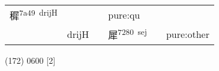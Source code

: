 \documentclass[14pt,a4paper]{scrartcl}
\begin{document}
\begin{longtable}[c]{@{}llllll@{}}
\begin{minipage}[t]{0.14\columnwidth}\raggedright\strut
穉\textsuperscript{7a49~drijH}
\strut\end{minipage} &
\begin{minipage}[t]{0.14\columnwidth}\raggedright\strut
\strut\end{minipage} &
\begin{minipage}[t]{0.14\columnwidth}\raggedright\strut
\strut\end{minipage} &
\begin{minipage}[t]{0.14\columnwidth}\raggedright\strut
pure:qu
\strut\end{minipage}\tabularnewline
\begin{minipage}[t]{0.14\columnwidth}\raggedright\strut
𡱕
\strut\end{minipage} &
\begin{minipage}[t]{0.14\columnwidth}\raggedright\strut
drijH
\strut\end{minipage} &
\begin{minipage}[t]{0.14\columnwidth}\raggedright\strut
\strut\end{minipage} &
\begin{minipage}[t]{0.14\columnwidth}\raggedright\strut
犀\textsuperscript{7280~sej}
\strut\end{minipage} &
\begin{minipage}[t]{0.14\columnwidth}\raggedright\strut
\strut\end{minipage} &
\begin{minipage}[t]{0.14\columnwidth}\raggedright\strut
pure:other
\strut\end{minipage}\tabularnewline
\bottomrule
\end{longtable}

(172) 0600 {[}2{]}
\end{document}
